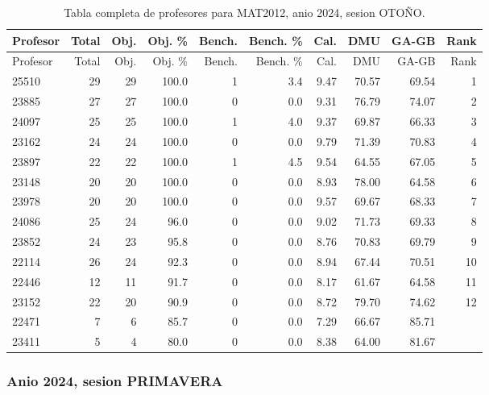 \begingroup
\scriptsize
\setlength{\tabcolsep}{3pt}
\begin{longtable}{lrrrrrrrrr}
\caption{Tabla completa de profesores para MAT2012, anio 2024, sesion OTOÑO.}\label{tab:prof-period-mat2012-2024-oto-o}\\
\toprule
Profesor & Total & Obj. & Obj. \% & Bench. & Bench. \% & Cal. & DMU & GA-GB & Rank \\
\midrule
\endfirsthead
\toprule
Profesor & Total & Obj. & Obj. \% & Bench. & Bench. \% & Cal. & DMU & GA-GB & Rank \\
\midrule
\endhead
25510 & 29 & 29 & 100.0 & 1 & 3.4 & 9.47 & 70.57 & 69.54 & 1 \\
23885 & 27 & 27 & 100.0 & 0 & 0.0 & 9.31 & 76.79 & 74.07 & 2 \\
24097 & 25 & 25 & 100.0 & 1 & 4.0 & 9.37 & 69.87 & 66.33 & 3 \\
23162 & 24 & 24 & 100.0 & 0 & 0.0 & 9.79 & 71.39 & 70.83 & 4 \\
23897 & 22 & 22 & 100.0 & 1 & 4.5 & 9.54 & 64.55 & 67.05 & 5 \\
23148 & 20 & 20 & 100.0 & 0 & 0.0 & 8.93 & 78.00 & 64.58 & 6 \\
23978 & 20 & 20 & 100.0 & 0 & 0.0 & 9.57 & 69.67 & 68.33 & 7 \\
24086 & 25 & 24 & 96.0 & 0 & 0.0 & 9.02 & 71.73 & 69.33 & 8 \\
23852 & 24 & 23 & 95.8 & 0 & 0.0 & 8.76 & 70.83 & 69.79 & 9 \\
22114 & 26 & 24 & 92.3 & 0 & 0.0 & 8.94 & 67.44 & 70.51 & 10 \\
22446 & 12 & 11 & 91.7 & 0 & 0.0 & 8.17 & 61.67 & 64.58 & 11 \\
23152 & 22 & 20 & 90.9 & 0 & 0.0 & 8.72 & 79.70 & 74.62 & 12 \\
22471 & 7 & 6 & 85.7 & 0 & 0.0 & 7.29 & 66.67 & 85.71 &  \\
23411 & 5 & 4 & 80.0 & 0 & 0.0 & 8.38 & 64.00 & 81.67 &  \\
\bottomrule
\end{longtable}
\endgroup

\subsubsection{Anio 2024, sesion PRIMAVERA}

